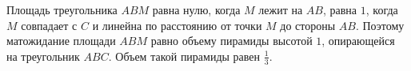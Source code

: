 \documentclass{article}
\begin{document}
Площадь треугольника $ABM$ равна нулю, когда $M$ лежит на $AB$, равна $1$, когда $M$ совпадает с $C$ и линейна по расстоянию от точки $M$ до стороны $AB$. Поэтому матожидание площади $ABM$ равно объему пирамиды высотой $1$, опирающейся на треугольник $ABC$. Объем такой пирамиды равен $\frac13$.
\end{document}
